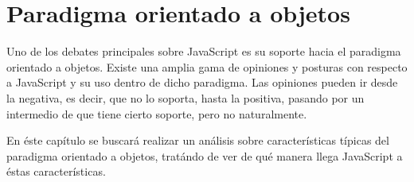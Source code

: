 \chapter{Paradigma orientado a objetos}

\label{Chapter4}


Uno de los debates principales sobre JavaScript es su soporte hacia el paradigma orientado a objetos. Existe una amplia gama de opiniones y posturas con respecto a JavaScript y su uso dentro de dicho paradigma. Las opiniones pueden ir desde la negativa, es decir, que no lo soporta, hasta la positiva, pasando por un intermedio de que tiene cierto soporte, pero no naturalmente.

En éste capítulo se buscará realizar un análisis sobre características típicas del paradigma orientado a objetos, tratándo de ver de qué manera llega JavaScript a éstas características.










